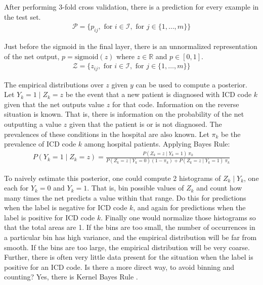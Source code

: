After performing 3-fold cross validation, there is a prediction for every example in the test set.
\begin{gather}
    \mathcal{P} = \{
        p_{ij},
        \text{ for } i \in \mathcal{I},
        \text{ for } j \in \{ 1, \dots, m \}
    \}
\end{gather}

Just before the sigmoid in the final layer, there is an unnormalized representation of the net output, $p = \text{sigmoid}(z)$ where $z \in \mathbb{R}$ and $p \in [0, 1]$.
\begin{gather}
    \mathcal{Z} = \{
        z_{ij},
        \text{ for } i \in \mathcal{I},
        \text{ for } j \in \{ 1, \dots, m \}
    \}
\end{gather}

The empirical distributions over $z$ given $y$ can be used to compute a posterior.  Let $Y_k = 1 \mid Z_k = z$ be the event that a new patient is diagnosed with ICD code $k$ given that the net outputs value $z$ for that code.  Information on the reverse situation is known.  That is, there is information on the probability of the net outputting a value $z$ given that the patient is or is not diagnosed.  The prevalences of these conditions in the hospital are also known.  Let $\pi_k$ be the prevalence of ICD code $k$ among hospital patients.  Applying Bayes Rule:
\begin{gather}
    P(Y_k = 1 \mid Z_k = z) = \frac
        {P(Z_k = z \mid Y_k = 1) \ \pi_k}
        {P(Z_k = z \mid Y_k = 0) (1 - \pi_k) + P(Z_k = z \mid Y_k = 1) \ \pi_k}
\end{gather}

To naively estimate this posterior, one could compute 2 histograms of $Z_k \mid Y_k$, one each for $Y_k=0$ and $Y_k=1$.  That is, bin possible values of $Z_k$ and count how many times the net predicts a value within that range.  Do this for predictions when the label is negative for ICD code $k$, and again for predictions when the label is positive for ICD code $k$.  Finally one would normalize those histograms so that the total areas are 1.  If the bins are too small, the number of occurrences in a particular bin has high variance, and the empirical distribution will be far from smooth.  If the bins are too large, the empirical distribution will be very coarse.  Further, there is often very little data present for the situation when the label is positive for an ICD code.  Is there a more direct way, to avoid binning and counting?  Yes, there is Kernel Bayes Rule \cite{fukumizu2013kernel}.

